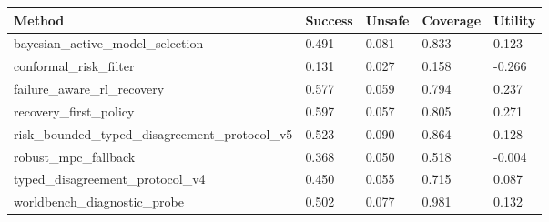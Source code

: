 \begin{tabular}{lllll}
\toprule
Method & Success & Unsafe & Coverage & Utility \\
\midrule
bayesian\_active\_model\_selection & 0.491 & 0.081 & 0.833 & 0.123 \\
conformal\_risk\_filter & 0.131 & 0.027 & 0.158 & -0.266 \\
failure\_aware\_rl\_recovery & 0.577 & 0.059 & 0.794 & 0.237 \\
recovery\_first\_policy & 0.597 & 0.057 & 0.805 & 0.271 \\
risk\_bounded\_typed\_disagreement\_protocol\_v5 & 0.523 & 0.090 & 0.864 & 0.128 \\
robust\_mpc\_fallback & 0.368 & 0.050 & 0.518 & -0.004 \\
typed\_disagreement\_protocol\_v4 & 0.450 & 0.055 & 0.715 & 0.087 \\
worldbench\_diagnostic\_probe & 0.502 & 0.077 & 0.981 & 0.132 \\
\bottomrule
\end{tabular}
